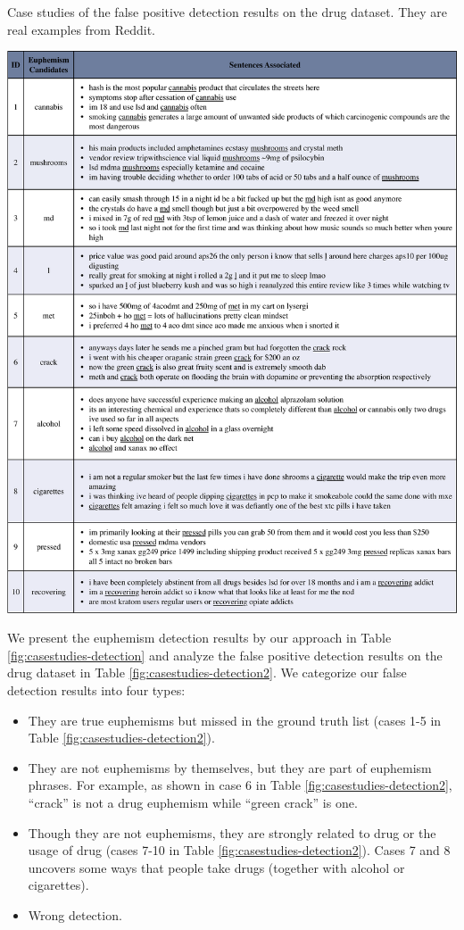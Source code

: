 \begin{table}
	\centering
	\caption{Case studies of the false positive detection results on the drug dataset. They are real examples from Reddit.}
	\includegraphics[width=1\linewidth]{figures/CaseStudies-Detection2}
	\label{fig:casestudies-detection2}
\end{table}

We present the euphemism detection results by our approach in Table \ref{fig:casestudies-detection} and analyze the false positive detection results on the drug dataset in Table \ref{fig:casestudies-detection2}. 
We categorize our false detection results into four types: 
\begin{itemize}
	\item They are true euphemisms but missed in the ground truth list (cases 1-5 in Table \ref{fig:casestudies-detection2}). 
	\item They are not euphemisms by themselves, but they are part of euphemism phrases. For example, as shown in case 6 in Table \ref{fig:casestudies-detection2}, ``crack'' is not a drug euphemism while ``green crack'' is one. 
	\item Though they are not euphemisms, they are strongly related to drug or the usage of drug (cases 7-10 in Table \ref{fig:casestudies-detection2}). Cases 7 and 8 uncovers some ways that people take drugs (together with alcohol or cigarettes).
	\item Wrong detection. 
\end{itemize}

